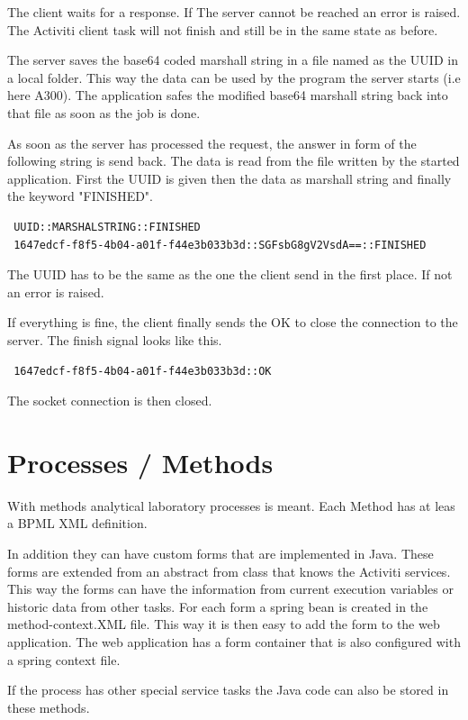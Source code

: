 \documentclass[paper=a4,twoside=false,BCOR=0mm,DIV=calc,fontsize=12pt]{scrartcl}
\begin{document}
The client waits for a response. If The server cannot be reached an error is raised. 
The Activiti client task will not finish and still be in the same state as before.

The server saves the base64 coded marshall string in a file named as the UUID in a local folder.
This way the data can be used by the program the server starts (i.e here A300). 
The application safes the modified base64 marshall string back into that file as soon as the job is done.

As soon as the server has processed the request, the answer in form of the following string is send back.
The data is read from the file written by the started application.
First the UUID is given then the data as marshall string and finally the keyword "FINISHED".

\begin{verbatim}
 UUID::MARSHALSTRING::FINISHED
 1647edcf-f8f5-4b04-a01f-f44e3b033b3d::SGFsbG8gV2VsdA==::FINISHED
\end{verbatim}

The UUID has to be the same as the one the client send in the first place. If not an error is raised.

If everything is fine, the client finally sends the OK to close the connection to the server.
The finish signal looks like this.
\begin{verbatim}
 1647edcf-f8f5-4b04-a01f-f44e3b033b3d::OK
\end{verbatim}
The socket connection is then closed.

\section{Processes / Methods}
With methods analytical laboratory processes is meant. Each Method has at leas a BPML XML definition.

In addition they can have custom forms that are implemented in Java. These forms are extended from an abstract from class that knows the Activiti services. This way the forms can have the information from current execution variables or historic data from other tasks. For each form a spring bean is created in the method-context.XML file. This way it is then easy to add the form to the web application. The web application has a form container that is also configured with a spring context file.

If the process has other special service tasks the Java code can also be stored in these methods. 
\end{document}
